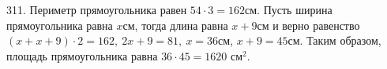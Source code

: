 311. Периметр прямоугольника равен $54\cdot3=162$см. Пусть ширина прямоугольника равна $x$см, тогда длина равна $x+9$см и верно равенство $(x+x+9)\cdot2=162,\ 2x+9=81,\ x=36$см, $x+9=45$см. Таким образом, площадь прямоугольника равна $36\cdot45=1620\text{ см}^2.$\\
